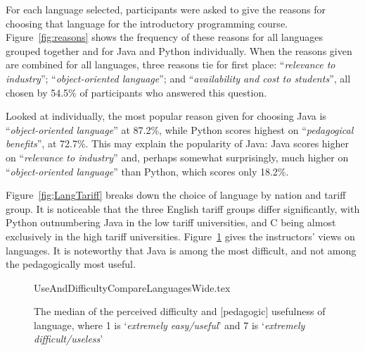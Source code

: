\documentclass[english,submission]{programming}
\begin{document}
For each language selected, participants were asked to give the
reasons for choosing that language for the introductory programming
course. Figure~\ref{fig:reasons} shows the frequency of these reasons
for all languages grouped together and for Java and Python
individually. When the reasons given are combined for all languages,
three reasons tie for first place: ``{\emph{relevance to industry}}'';
``{\emph{object-oriented language}}''; and ``{\emph{availability and
cost to students}}'', all chosen by 54.5\% of participants who
answered this question.

Looked at individually, the most popular reason given for choosing
Java is ``{\emph{object-oriented language}}'' at 87.2\%, while Python
scores highest on ``{\emph{pedagogical benefits}}'', at 72.7\%. This
may explain the popularity of Java: Java scores higher on
``{\emph{relevance to industry}}'' and, perhaps somewhat surprisingly,
much higher on ``{\emph{object-oriented language}}'' than Python,
which scores only 18.2\%.


Figure~\ref{fig;LangTariff} breaks down the choice of language by
nation and tariff group.  It is noticeable that the three English
tariff groups differ significantly, with Python outnumbering Java in
the low tariff universities, and C being almost exclusively in the
high tariff universities. Figure~\ref{fig:utility} gives the
instructors' views on languages. It is noteworthy that Java is among
the most difficult, and not among the pedagogically most useful.

\begin{figure}
\begin{center}
{UseAndDifficultyCompareLanguagesWide.tex}
\end{center}
\caption{The median of the perceived difficulty and [pedagogic] usefulness of language, where 1 is `{\emph{extremely easy/useful}}' and 7 is `{\emph{extremely difficult/useless}}'%
\label{fig:utility}}
\end{figure}
\end{document}
